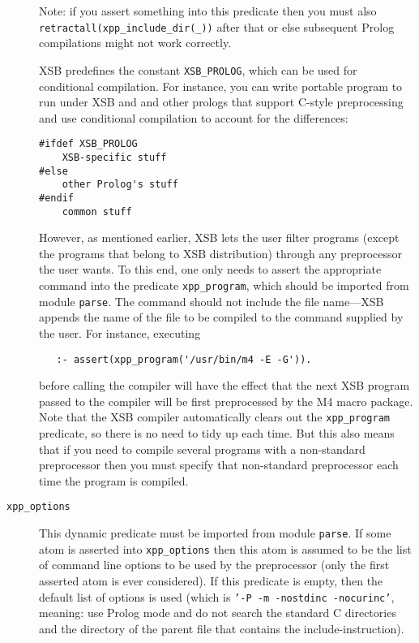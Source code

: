 \begin{description}
   Note: if you assert something into this predicate then you must also {\tt
    retractall(xpp\_include\_dir(\_))} after that or else subsequent Prolog
  compilations might not work correctly.

  XSB predefines the constant {\tt XSB\_PROLOG}, which can be used for
  conditional compilation. For instance, you can write portable program
  to run under XSB and and other prologs that support C-style
  preprocessing and use conditional compilation to account for the
  differences: 
  \begin{samepage}
  \begin{verbatim}
#ifdef XSB_PROLOG
    XSB-specific stuff
#else
    other Prolog's stuff
#endif
    common stuff
  \end{verbatim}
  \end{samepage}

  However, as mentioned earlier, XSB lets the user filter programs (except
  the programs that belong to XSB distribution) through any preprocessor
  the user wants. To this end, one only needs to assert the appropriate
  command into the predicate \verb|xpp_program|, which should be imported
  from module {\tt parse}. The command should not include the file
  name---XSB appends the name of the file to be compiled to the command
  supplied by the user. For instance, executing
  \begin{verbatim}
   :- assert(xpp_program('/usr/bin/m4 -E -G')).
  \end{verbatim}
  before calling the compiler will have the effect that the next XSB
  program passed to the compiler will be first preprocessed by the M4 macro
  package. Note that the XSB compiler automatically clears out the
  {\tt xpp\_program} predicate, so there is no need to tidy up each time.
  But this also means that if you need to compile several programs with a
  non-standard preprocessor then you must specify that non-standard
  preprocessor each time the program is compiled.
  
\item[{\tt xpp\_options}]  This dynamic predicate
  must be imported from module {\tt parse}.  If some atom is asserted into
  {\tt xpp\_options} then this atom is assumed to be the list of command
  line options to be used by the preprocessor (only the first asserted atom
  is ever considered). If this predicate is empty, then the default list of
  options is used (which is {\tt '-P -m -nostdinc -nocurinc'}, meaning: use
  Prolog mode and do not search the standard C directories and the
  directory of the parent file that contains the include-instruction).
  

\end{description}
